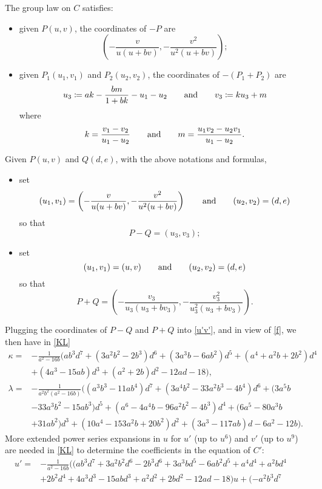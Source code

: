 \documentclass{gtpart}
\theoremstyle{definition}
\theoremstyle{remark}
\newcommand{\ad}{{\rm and}}
\newcommand{\K}{\kappa}
\begin{document}
The group law on $C$ satisfies: 
\begin{itemize}
 \item given $P(u,v)$, the coordinates of $-P$ are 
 \[
  \left( -\frac{v}{u (u + b v)},-\frac{v^2}{u^2 (u + b v)} \right); 
 \]

 \item given $P_1(u_1,v_1)$ and $P_2(u_2,v_2)$, the coordinates of $-(P_1 + P_2)$ are 
 \[
  u_3 \coloneqq a k - \frac{b m}{1 + b k} - u_1 - u_2 \qquad \ad \qquad v_3 \coloneqq k u_3 + m 
 \]
 where 
 \[
  k = \frac{v_1 - v_2}{u_1 - u_2} \qquad \ad \qquad m = \frac{u_1 v_2 - u_2 v_1}{u_1 - u_2}.  
 \]
\end{itemize}
Given $P(u,v)$ and $Q(d,e)$, with the above notations and formulas, 
\begin{itemize}
 \item set 
 \[
  (u_1,v_1) = \left( -\frac{v}{u (u + b v)},-\frac{v^2}{u^2 (u + b v)} \right) \qquad \ad \qquad (u_2,v_2) = (d,e) 
 \]
 so that 
 \[
  P - Q = (u_3,v_3); 
 \]

 \item set 
 \[
  (u_1,v_1) = (u,v) \qquad \ad \qquad (u_2,v_2) = (d,e) 
 \]
 so that 
 \[
  P + Q = \left( -\frac{v_3}{u_3 (u_3 + b v_3)},-\frac{v_3^2}{u_3^2 (u_3 + b v_3)} \right).  
 \]
\end{itemize}
Plugging the coordinates of $P - Q$ and $P + Q$ into \eqref{u'v'}, and in view of \eqref{f}, 
we then have in \eqref{KL} 
\begin{equation*}
\begin{split}
      \K = & -\frac{1}{a^2 - 16 b} \big( a b^3 d^7 + (3 a^2 b^2 - 2 b^3) d^6 + (3 a^3 b - 6 a b^2) d^5 + (a^4 + a^2 b + 2 b^2) d^4 \\
           & + (4 a^3 - 15 a b) d^3 + (a^2 + 2 b) d^2 - 12 a d - 18 \big), \\
 \lambda = & -\frac{1}{a^2 b^2 (a^2 - 16 b)} \big( (a^3  b^3 - 11 a b^4) d^7 + (3 a^4 b^2 - 33 a^2 b^3 - 4 b^4) d^6 + (3 a^5 b \\
           & - 33 a^3 b^2 - 15 a b^3) d^5 + (a^6 - 4 a^4 b - 96 a^2 b^2 - 4 b^3) d^4 + (6 a^5 - 80 a^3 b \\
           & + 31 a b^2) d^3 + (10 a^4 - 153 a^2 b + 20 b^2) d^2 + (3 a^3 - 117 a b) d - 6 a^2 - 12 b \big).  
\end{split}
\end{equation*}
More extended power series expansions in $u$ for $u'$ (up to $u^6$) and $v'$ (up to $u^9$) are needed in \eqref{KL} to determine the coefficients in the equation of $C'$: 
\begin{equation*}
\begin{split}
 u' = & -\frac{1}{a^2 - 16 b} \big( (a b^3 d^7 + 3 a^2 b^2 d^6 - 2 b^3 d^6 + 3 a^3 b d^5 - 6 a b^2 d^5 + a^4 d^4 + a^2 b d^4 \quad~~~ \\
      & + 2 b^2 d^4 + 4 a^3 d^3 - 15 a b d^3 + a^2 d^2 + 2 b d^2 - 12 a d - 18) u + (-a^2 b^3 d^7 
\end{split}
\end{equation*}
\end{document}

